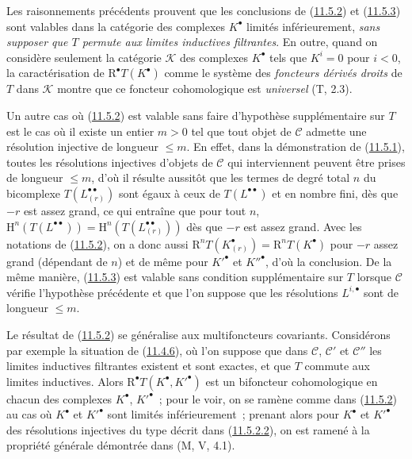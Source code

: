 \begin{remark}[11.5.4]
\label{0.11.5.4-fr}
Les raisonnements précédents prouvent que les conclusions de
(\hyperref[0.11.5.2-fr]{11.5.2}) et
(\hyperref[0.11.5.3-fr]{11.5.3}) sont valables dans la catégorie des
complexes $K^\bullet$ limités inférieurement, \emph{sans supposer que $T$
permute aux limites inductives filtrantes}. En outre, quand on considère
seulement la catégorie $\mathcal K$ des complexes $K^\bullet$ tels que
$K^i=0$ pour $i<0$, la caractérisation de $\mathrm R^\bullet T(K^\bullet)$
comme le système des \emph{foncteurs dérivés droits} de $T$ dans $\mathcal K$
montre que ce foncteur cohomologique est \emph{universel} (T, 2.3).

Un autre cas où (\hyperref[0.11.5.2-fr]{11.5.2}) est valable sans faire
d'hypothèse supplémentaire sur $T$ est le cas où il existe un entier $m>0$
tel que tout objet de $\mathcal C$ admette une résolution injective de longueur
$\leq m$. En effet, dans la démonstration de
(\hyperref[0.11.5.1-fr]{11.5.1}), toutes les résolutions injectives d'objets
de $\mathcal C$ qui interviennent peuvent être prises de longueur $\leq m$,
d'où il résulte aussitôt que les termes de degré total $n$ du bicomplexe
$T(L_{(r)}^{\bullet\bullet})$ sont égaux à ceux de
$T(L^{\bullet\bullet})$ et en nombre fini, dès que $-r$ est assez grand, ce qui
entraîne que pour tout $n$,
$\mathrm H^n(T(L^{\bullet\bullet}))=
\mathrm H^n(T(L_{(r)}^{\bullet\bullet}))$ dès que $-r$ est assez grand. Avec
les notations de (\hyperref[0.11.5.2-fr]{11.5.2}), on a donc aussi
$\mathrm R^nT(K_{(r)}^\bullet)=\mathrm R^nT(K^\bullet)$ pour $-r$ assez grand
(dépendant de $n$) et de même pour $K'^\bullet$ et $K''^\bullet$, d'où la
conclusion. De la même manière, (\hyperref[0.11.5.3-fr]{11.5.3}) est valable
sans condition supplémentaire sur $T$ lorsque $\mathcal C$ vérifie
l'hypothèse précédente et que l'on suppose que les résolutions
$L^{i,\bullet}$ sont de longueur $\leq m$.
\end{remark}

\begin{env}[11.5.5]
\label{0.11.5.5-fr}
Le résultat de (\hyperref[0.11.5.2-fr]{11.5.2}) se généralise aux
multifoncteurs covariants. Considérons par exemple la situation de
(\hyperref[0.11.4.6-fr]{11.4.6}), où l'on suppose que dans $\mathcal C$,
$\mathcal C'$ et $\mathcal C''$
les limites inductives filtrantes existent et sont exactes, et que $T$ commute
aux limites inductives. Alors $\mathrm R^\bullet T(K^\bullet,K'^\bullet)$ est
un bifoncteur cohomologique en chacun des complexes $K^\bullet$,
$K'^\bullet$~; pour le voir, on se ramène comme dans
(\hyperref[0.11.5.2-fr]{11.5.2}) au cas où $K^\bullet$ et $K'^\bullet$ sont
limités inférieurement~; prenant alors pour $K^\bullet$ et $K'^\bullet$ des
résolutions injectives du type décrit dans
(\hyperref[0.11.5.2.2-fr]{11.5.2.2}), on est ramené à la propriété générale
démontrée dans (M, V, 4.1).
\end{env}

